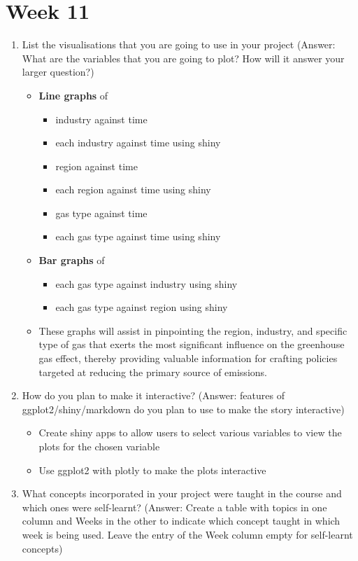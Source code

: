 \documentclass[
]{article}
\providecommand{\tightlist}{%
  \setlength{\itemsep}{0pt}\setlength{\parskip}{0pt}}
\begin{document}
\hypertarget{week-11}{%
\section{Week 11}\label{week-11}}

\begin{enumerate}
\def\labelenumi{\arabic{enumi}.}
\item
  List the visualisations that you are going to use in your project
  (Answer: What are the variables that you are going to plot? How will
  it answer your larger question?)

  \begin{itemize}
  \item
    \textbf{Line graphs} of

    \begin{itemize}
    \item
      industry against time
    \item
      each industry against time using shiny
    \item
      region against time
    \item
      each region against time using shiny
    \item
      gas type against time
    \item
      each gas type against time using shiny
    \end{itemize}
  \item
    \textbf{Bar graphs} of

    \begin{itemize}
    \item
      each gas type against industry using shiny
    \item
      each gas type against region using shiny
    \end{itemize}
  \item
    These graphs will assist in pinpointing the region, industry, and
    specific type of gas that exerts the most significant influence on
    the greenhouse gas effect, thereby providing valuable information
    for crafting policies targeted at reducing the primary source of
    emissions.
  \end{itemize}
\item
  How do you plan to make it interactive? (Answer: features of
  ggplot2/shiny/markdown do you plan to use to make the story
  interactive)

  \begin{itemize}
  \tightlist
  \item
    Create shiny apps to allow users to select various variables to view
    the plots for the chosen variable
  \item
    Use ggplot2 with plotly to make the plots interactive
  \end{itemize}
\item
  What concepts incorporated in your project were taught in the course
  and which ones were self-learnt? (Answer: Create a table with topics
  in one column and Weeks in the other to indicate which concept taught
  in which week is being used. Leave the entry of the Week column empty
  for self-learnt concepts)


\end{enumerate}
\end{document}
